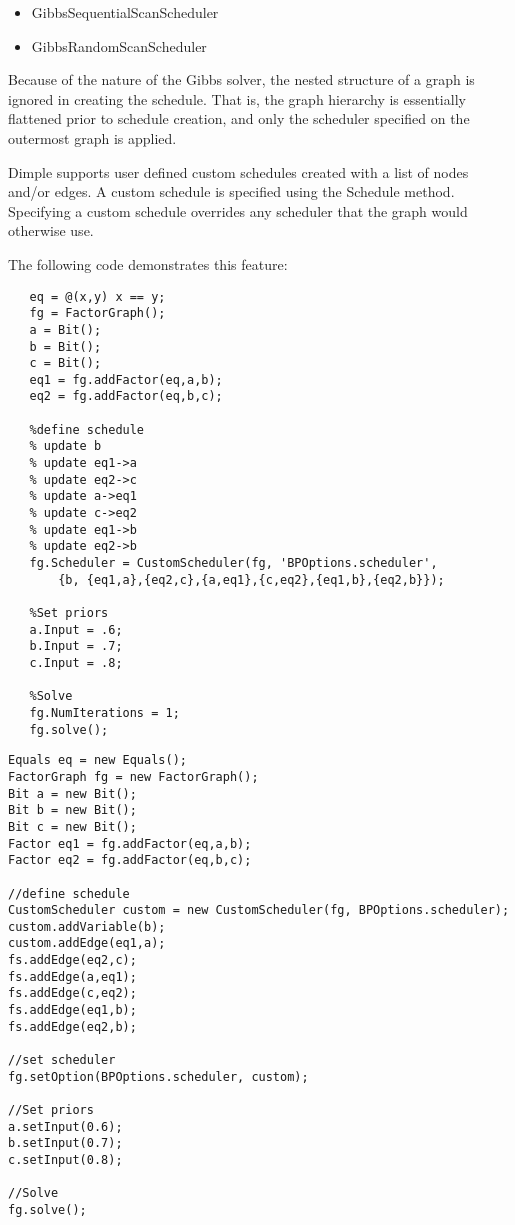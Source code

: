 \begin{itemize}
\item GibbsSequentialScanScheduler
\item GibbsRandomScanScheduler
\end{itemize}

Because of the nature of the Gibbs solver, the nested structure of a graph is ignored in creating the schedule.  That is, the graph hierarchy is essentially flattened prior to schedule creation, and only the scheduler specified on the outermost graph is applied.


\label{sec:CustomSchedules}


Dimple supports user defined custom schedules created with a list of nodes and/or edges.  A custom schedule is specified using the Schedule method.  Specifying a custom schedule overrides any scheduler that the graph would otherwise use.

The following code demonstrates this feature:

\ifmatlab

\begin{lstlisting}
   eq = @(x,y) x == y;
   fg = FactorGraph();
   a = Bit();
   b = Bit();
   c = Bit();
   eq1 = fg.addFactor(eq,a,b);
   eq2 = fg.addFactor(eq,b,c);
   
   %define schedule
   % update b
   % update eq1->a
   % update eq2->c
   % update a->eq1
   % update c->eq2
   % update eq1->b
   % update eq2->b
   fg.Scheduler = CustomScheduler(fg, 'BPOptions.scheduler', 
       {b, {eq1,a},{eq2,c},{a,eq1},{c,eq2},{eq1,b},{eq2,b}});
   
   %Set priors
   a.Input = .6;
   b.Input = .7;
   c.Input = .8;
   
   %Solve
   fg.NumIterations = 1;
   fg.solve();
\end{lstlisting}

\fi

\ifjava
\begin{lstlisting}
Equals eq = new Equals();
FactorGraph fg = new FactorGraph();
Bit a = new Bit();
Bit b = new Bit();
Bit c = new Bit();
Factor eq1 = fg.addFactor(eq,a,b);
Factor eq2 = fg.addFactor(eq,b,c);

//define schedule
CustomScheduler custom = new CustomScheduler(fg, BPOptions.scheduler);
custom.addVariable(b);
custom.addEdge(eq1,a);
fs.addEdge(eq2,c);
fs.addEdge(a,eq1);
fs.addEdge(c,eq2);
fs.addEdge(eq1,b);
fs.addEdge(eq2,b);
		
//set scheduler
fg.setOption(BPOptions.scheduler, custom);

//Set priors
a.setInput(0.6);
b.setInput(0.7);
c.setInput(0.8);

//Solve
fg.solve();
\end{lstlisting}
\fi

